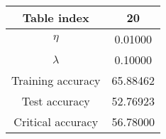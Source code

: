 \begin{tabular}{cc}
\hline \hline
Table index &        20 \\
\hline \hline
$\eta$            &  0.01000 \\
$\lambda$         &  0.10000 \\
Training accuracy & 65.88462 \\
Test accuracy     & 52.76923 \\
Critical accuracy & 56.78000 \\
\hline \hline
\end{tabular}
